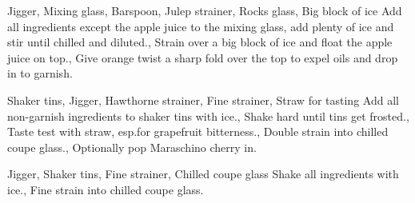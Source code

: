 \documentclass[../main.tex]{subfiles}
\begin{document}
\clearpage
{}

%
{Jigger, Mixing glass, Barspoon, Julep strainer, Rocks glass, Big block of ice}
%
{
	{Add all ingredients except the apple juice to the mixing glass, add plenty of ice and stir until chilled and diluted.},
	{Strain over a big block of ice and float the apple juice on top.},
	{Give orange twist a sharp fold over the top to expel oils and drop in to garnish.}
}

\cocktailDivider

{Shaker tins, Jigger, Hawthorne strainer, Fine strainer, Straw for tasting}
{
    {Add all non-garnish ingredients to shaker tins with ice.},
    {Shake hard until tins get frosted.},
    {Taste test with straw, esp.\@ for grapefruit bitterness.},
    {Double strain into chilled coupe glass.},
    Optionally pop Maraschino cherry in.
}

\cocktailDivider

{Jigger, Shaker tins, Fine strainer, Chilled coupe glass}
{
    Shake all ingredients with ice.,
    Fine strain into chilled coupe glass.
}

\end{document}

